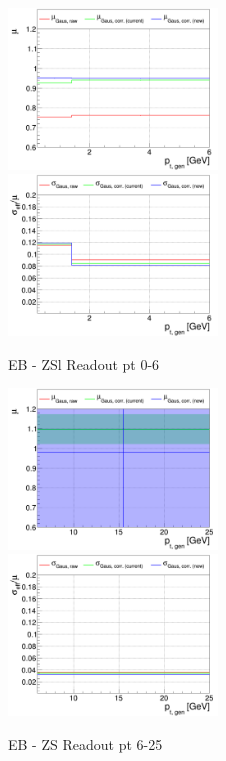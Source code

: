 \begin{figure}
\includegraphics[width=0.495\textwidth]{./ECAL_plots/plotsPU/EB/ZS/pdf/GENPT/EBZS_GENPT_0000_0006_MuOverBins.pdf}
\includegraphics[width=0.495\textwidth]{./ECAL_plots/plotsPU/EB/ZS/pdf/GENPT/EBZS_GENPT_0000_0006_EffSigmaOverBins.pdf}
\caption{EB - ZSl Readout pt 0-6}
\end{figure}

\begin{figure}
\includegraphics[width=0.495\textwidth]{./ECAL_plots/plotsPU/EB/ZS/pdf/GENPT/EBZS_GENPT_0006_0025_MuOverBins.pdf}
\includegraphics[width=0.495\textwidth]{./ECAL_plots/plotsPU/EB/ZS/pdf/GENPT/EBZS_GENPT_0006_0025_EffSigmaOverBins.pdf}
\caption{EB - ZS Readout pt 6-25}
\end{figure}

